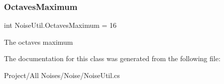 \subsubsection{\texorpdfstring{Octaves\+Maximum}{OctavesMaximum}}
{\footnotesize\ttfamily int Noise\+Util.\+Octaves\+Maximum = 16\hspace{0.3cm}{\ttfamily [static]}}



The octaves maximum 



The documentation for this class was generated from the following file\+:\begin{DoxyCompactItemize}
\item 
Project/\+All Noises/\+Noise/Noise\+Util.\+cs\end{DoxyCompactItemize}
